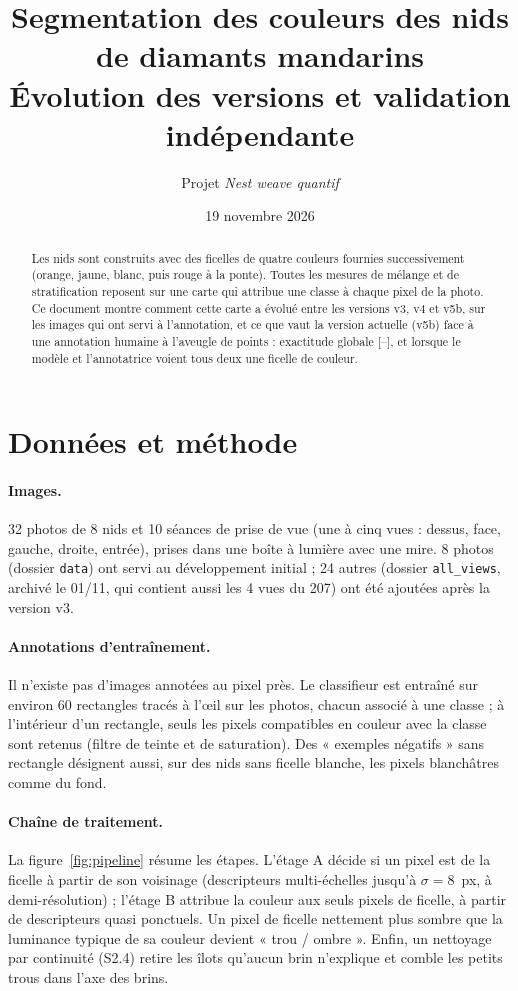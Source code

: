 \documentclass[11pt,a4paper]{article}
\title{Segmentation des couleurs des nids de diamants mandarins\\[2pt]
\large Évolution des versions et validation indépendante}
\author{Projet \emph{Nest weave quantif}}
\date{19 novembre 2026}
\begin{document}
\maketitle

\begin{abstract}
Les nids sont construits avec des ficelles de quatre couleurs fournies successivement
(orange, jaune, blanc, puis rouge à la ponte). Toutes les mesures de mélange et de stratification
reposent sur une carte qui attribue une classe à chaque pixel de la photo. Ce document montre
comment cette carte a évolué entre les versions v3, v4 et v5b, sur les images qui ont servi à
l'annotation, et ce que vaut la version actuelle (v5b) face à une annotation humaine
à l'aveugle de \valnpoints{} points : exactitude globale \valacc{} [\valacclo--\valacchi],
et \valcolourok{} lorsque le modèle et l'annotatrice voient tous deux une ficelle de couleur.
\end{abstract}

\section{Données et méthode}

\paragraph{Images.} 32 photos de 8 nids et 10 séances de prise de vue (une à cinq vues : dessus,
face, gauche, droite, entrée), prises dans une boîte à lumière avec une mire. 8 photos (dossier
\texttt{data}) ont servi au développement initial ; 24 autres (dossier \texttt{all\_views}, archivé
le 01/11, qui contient aussi les 4 vues du 207) ont été ajoutées après la version v3.

\paragraph{Annotations d'entraînement.} Il n'existe pas d'images annotées au pixel près.
Le classifieur est entraîné sur environ 60 rectangles tracés à l'œil sur les photos, chacun associé à
une classe ; à l'intérieur d'un rectangle, seuls les pixels compatibles en couleur avec la classe sont
retenus (filtre de teinte et de saturation). Des « exemples négatifs » sans rectangle désignent
aussi, sur des nids sans ficelle blanche, les pixels blanchâtres comme du fond.

\paragraph{Chaîne de traitement.} La figure~\ref{fig:pipeline} résume les étapes.
L'étage A décide si un pixel est de la ficelle à partir de son voisinage (descripteurs multi-échelles
jusqu'à $\sigma = 8$~px, à demi-résolution) ; l'étage B attribue la couleur aux seuls pixels de ficelle,
à partir de descripteurs quasi ponctuels. Un pixel de ficelle nettement plus sombre que la luminance
typique de sa couleur devient « trou / ombre ». Enfin, un nettoyage par continuité (S2.4) retire les
îlots qu'aucun brin n'explique et comble les petits trous dans l'axe des brins.
\end{document}
